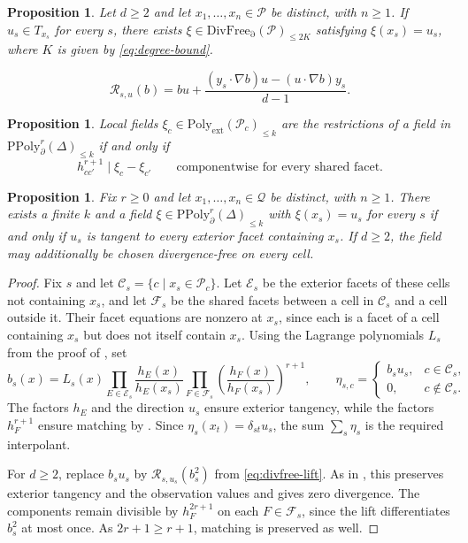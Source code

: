 \documentclass[10pt,a4paper]{amsart}
\theoremstyle{plain}
\newtheorem{proposition}[theorem]{Proposition}
\theoremstyle{definition}
\theoremstyle{remark}
\newcommand{\Pext}[1]{{\mathrm{Poly}_{\mathrm{ext}}({#1})}}
\newcommand{\PPt}[2]{{\mathrm{PPoly}^{#1}_{\partial}({#2})}}
\newcommand{\Dt}[1]{{\mathrm{DivFree_{\partial}}({#1})}}
\newcommand{\mP}{\mathcal{P}}
\newcommand{\mQ}{\mathcal{Q}}
\begin{document}
\begin{proposition}\label{prop:divfree-interpolation}
Let $d\ge2$ and let $x_1,\ldots,x_n\in\mP$ be distinct, with $n\ge1$. If $u_s\in T_{x_s}$ for every $s$, there exists $\xi\in\Dt{\mP}_{\le 2K}$ satisfying $\xi(x_s)=u_s$, where $K$ is given by \eqref{eq:degree-bound}.
\end{proposition}

\begin{equation}\label{eq:divfree-lift}
\mathcal R_{s,u}(b)
=bu+\frac{(y_s\cdot\nabla b)u-(u\cdot\nabla b)y_s}{d-1}.
\end{equation}

\begin{proposition}\label{prop:gluedlinear}
Local fields $\xi_c\in\Pext{\mP_c}_{\le k}$ are the restrictions of a field in $\PPt{r}{\Delta}_{\le k}$ if and only if
\begin{equation}\label{eq:piecewise-matching}
h_{cc'}^{r+1}\mid\xi_c-\xi_{c'}
\qquad\text{componentwise for every shared facet.}
\end{equation}
\end{proposition}

\begin{proposition}\label{prop:piecewise-interpolation}
Fix $r\ge0$ and let $x_1,\ldots,x_n\in\mQ$ be distinct, with $n\ge1$. There exists a finite $k$ and a field $\xi\in\PPt{r}{\Delta}_{\le k}$ with $\xi(x_s)=u_s$ for every $s$ if and only if $u_s$ is tangent to every exterior facet containing $x_s$. If $d\ge2$, the field may additionally be chosen divergence-free on every cell.
\end{proposition}

\begin{proof}
Fix $s$ and let $\mathcal C_s=\{c\mid x_s\in\mP_c\}$. Let $\mathcal E_s$ be the exterior facets of these cells not containing $x_s$, and let $\mathcal F_s$ be the shared facets between a cell in $\mathcal C_s$ and a cell outside it. Their facet equations are nonzero at $x_s$, since each is a facet of a cell containing $x_s$ but does not itself contain $x_s$. Using the Lagrange polynomials $L_s$ from the proof of , set
\[
b_s(x)=L_s(x)\prod_{E\in\mathcal E_s}\frac{h_E(x)}{h_E(x_s)}
\prod_{F\in\mathcal F_s}\left(\frac{h_F(x)}{h_F(x_s)}\right)^{r+1},
\qquad
\eta_{s,c}=\begin{cases}
b_su_s,&c\in\mathcal C_s,\\
0,&c\notin\mathcal C_s.
\end{cases}
\]
The factors $h_E$ and the direction $u_s$ ensure exterior tangency, while the factors $h_F^{r+1}$ ensure matching by . Since $\eta_s(x_t)=\delta_{st}u_s$, the sum $\sum_s\eta_s$ is the required interpolant.

For $d\ge2$, replace $b_su_s$ by $\mathcal R_{s,u_s}(b_s^2)$ from \eqref{eq:divfree-lift}. As in , this preserves exterior tangency and the observation values and gives zero divergence. The components remain divisible by $h_F^{2r+1}$ on each $F\in\mathcal F_s$, since the lift differentiates $b_s^2$ at most once. As $2r+1\ge r+1$, matching is preserved as well.
\end{proof}
\end{document}
